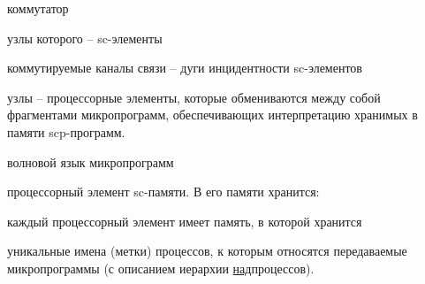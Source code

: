 \begin{textitemize}
	\item коммутатор
	\begin{textitemize}
		\item узлы которого -- sc-элементы
		\item коммутируемые каналы связи -- дуги инцидентности sc-элементов
		\item узлы -- процессорные элементы, которые обмениваются между собой фрагментами микропрограмм, обеспечивающих интерпретацию хранимых в памяти scp-программ.
		\item волновой язык микропрограмм
	\end{textitemize}
	\item процессорный элемент sc-памяти. В его памяти хранится:
\end{textitemize}

	\item каждый процессорный элемент имеет память, в которой хранится
		\begin{textitemize}
		\item уникальные имена (метки) процессов, к которым относятся передаваемые микропрограммы (с описанием иерархии \underline{над}процессов).
	\end{textitemize}
	
